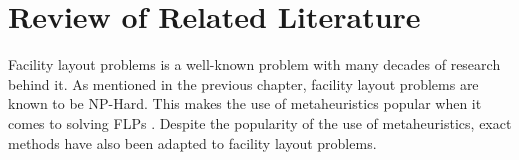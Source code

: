 \chapter{Review of Related Literature} \label{sec:rrl-title}



Facility layout problems is a well-known problem with many decades of research behind it. As mentioned in the previous chapter, facility layout problems are known to be NP-Hard. This makes the use of metaheuristics popular when it comes to solving FLPs \cite{Hosseini-Nasab2018}. Despite the popularity of the use of metaheuristics, exact methods have also been adapted to facility layout problems.
